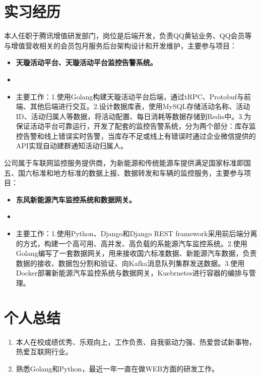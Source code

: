 \documentclass{resume}
\begin{document}

\section{实习经历}
\begin{onehalfspacing}
本人任职于腾讯增值研发部门，岗位是后端开发，负责QQ黄钻业务、QQ会员等与增值营收相关的会员包月服务后台架构设计和开发维护，主要参与项目：
\begin{itemize}
  \item \textbf{天璇活动平台、天璇活动平台监控告警系统。}
  \item {}
  \item 主要工作：1.使用Golang构建天璇活动平台后端，通过tRPC、Protobuf与前端、其他后端进行交互。2.设计数据库表，使用MySQL存储活动名称、活动ID、活动归属人等数据，将活动配置、每日消耗等数据存储到Redis中。3.为保证活动平台可靠运行，开发了配套的监控告警系统，分为两个部分：库存监控告警和线上错误实时告警，当库存不足或线上有错误时通过企业微信提供的API实现自动建群通知活动归属人。
\end{itemize}
\end{onehalfspacing}

\begin{onehalfspacing}
公司属于车联网监控服务提供商，为新能源和传统能源车提供满足国家标准即国五、国六标准和地方标准的数据上报、数据转发和车辆的监控服务，主要参与项目：
\begin{itemize}
  \item \textbf{东风新能源汽车监控系统和数据网关。}
  \item {}
  \item 主要工作：1.使用Python、Django和Django REST framework采用前后端分离的方式，构建一个高可用、高并发、高负载的系能源汽车监控系统。2.使用Golang编写了一套数据网关，用来接收国六标准数据、新能源汽车数据，负责数据的接收、数据包分割和验证、向Kafka消息队列集群发送数据。3.使用Docker部署新能源汽车监控系统与数据网关，Kuebrnetes进行容器的编排与管理。
\end{itemize}
\end{onehalfspacing}

\section{个人总结}
\begin{enumerate}
  \item 本人在校成绩优秀、乐观向上，工作负责、自我驱动力强、热爱尝试新事物，热爱互联网行业。
  \item 熟悉Golang和Python，最近一年一直在做WEB方面的研发工作。
\end{enumerate}


%
%
\end{document}
